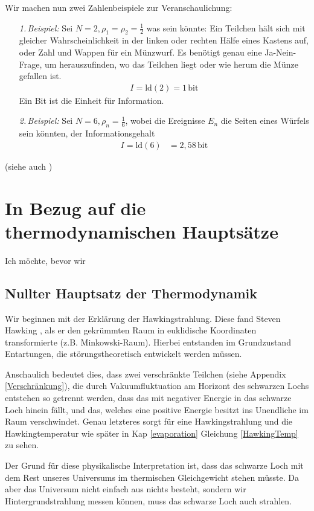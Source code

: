 \documentclass[ngerman]{scrartcl}
\begin{document}
Wir machen nun zwei Zahlenbeispiele zur Veranschaulichung:
	\begin{itemize}
		\item[\textit{1.\,Beispiel:}] Sei $N=2, \rho_1 = \rho_2= \frac{1}{2}$ was sein könnte: Ein Teilchen hält sich mit gleicher Wahrscheinlichkeit in der linken oder rechten Hälfe eines Kastens auf, oder Zahl und Wappen für ein Münzwurf.
		Es benötigt genau eine Ja-Nein-Frage, um herauszufinden, wo das Teilchen liegt oder wie herum die Münze gefallen ist.
			\begin{align*}
				I = \mathrm{ld}(2) = 1 \,\mathrm{bit}
			\end{align*}
		Ein Bit ist die Einheit für Information.
		\item[\textit{2.\,Beispiel:}]Sei $N=6, \rho_n = \frac{1}{6}$, wobei die Ereignisse $E_n$ die Seiten eines Würfels sein könnten, der Informationsgehalt
			\begin{align*}
				I = \mathrm{ld}(6) &= 2,58 \,\mathrm{bit}
			\end{align*}
	\end{itemize}
(siehe auch \cite{Brenig})

\section{In Bezug auf die thermodynamischen Hauptsätze}
Ich möchte, bevor wir 

	\subsection{Nullter Hauptsatz der Thermodynamik}
	Wir beginnen mit der Erklärung der Hawkingstrahlung. Diese fand Steven Hawking \cite{ParticleCreation}, als er den gekrümmten Raum in euklidische Koordinaten transformierte (z.B. Minkowski-Raum). Hierbei entstanden im Grundzustand Entartungen, die störungstheoretisch entwickelt werden müssen. 
	
	Anschaulich bedeutet dies, dass zwei verschränkte Teilchen (siehe Appendix \ref{Verschränkung}), die durch Vakuumfluktuation am Horizont des schwarzen Lochs entstehen so getrennt werden, dass das mit negativer Energie in das schwarze Loch hinein fällt, und das, welches eine positive Energie besitzt ins Unendliche im Raum verschwindet. 
	Genau letzteres sorgt für eine Hawkingstrahlung und die Hawkingtemperatur wie später in Kap \ref{evaporation} Gleichung \eqref{HawkingTemp} zu sehen.
	
	Der Grund für diese physikalische Interpretation ist, dass das schwarze Loch mit dem Rest unseres Universums im thermischen Gleichgewicht stehen müsste. Da aber das Universum nicht einfach aus nichts besteht, sondern wir Hintergrundstrahlung messen können, muss das schwarze Loch auch strahlen. 
	
\end{document}
